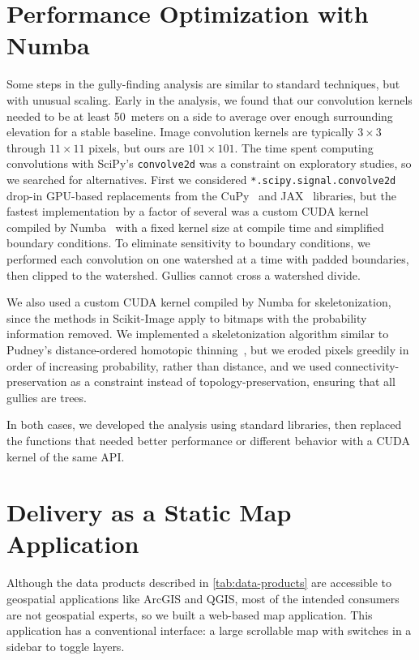 \section{Performance Optimization with Numba}\label{sec:numba}

Some steps in the gully-finding analysis are similar to standard techniques, but with unusual scaling. Early in the analysis, we found that our convolution kernels needed to be at least 50~meters on a side to average over enough surrounding elevation for a stable baseline. Image convolution kernels are typically $3\times 3$ through $11\times 11$ pixels, but ours are $101\times 101$. The time spent computing convolutions with SciPy's \texttt{convolve2d} was a constraint on exploratory studies, so we searched for alternatives. First we considered \texttt{*.scipy.signal.convolve2d} drop-in GPU-based replacements from the CuPy~\citep{cupy} and JAX~\citep{jax} libraries, but the fastest implementation by a factor of several was a custom CUDA kernel compiled by Numba~\citep{numba} with a fixed kernel size at compile time and simplified boundary conditions. To eliminate sensitivity to boundary conditions, we performed each convolution on one watershed at a time with padded boundaries, then clipped to the watershed. Gullies cannot cross a watershed divide.

We also used a custom CUDA kernel compiled by Numba for skeletonization, since the methods in Scikit-Image apply to bitmaps with the probability information removed. We implemented a skeletonization algorithm similar to Pudney's distance-ordered homotopic thinning~\citep{PUDNEY1998404}, but we eroded pixels greedily in order of increasing probability, rather than distance, and we used connectivity-preservation as a constraint instead of topology-preservation, ensuring that all gullies are trees.

In both cases, we developed the analysis using standard libraries, then replaced the functions that needed better performance or different behavior with a CUDA kernel of the same API.

\section{Delivery as a Static Map Application}

Although the data products described in \cref{tab:data-products} are accessible to geospatial applications like ArcGIS and QGIS, most of the intended consumers are not geospatial experts, so we built a web-based map application. This application has a conventional interface: a large scrollable map with switches in a sidebar to toggle layers.

